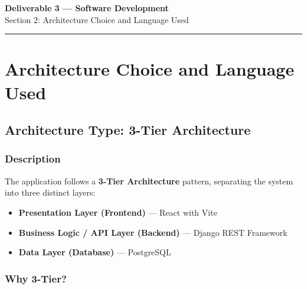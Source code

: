 \documentclass[12pt, a4paper]{article}
\begin{document}

\begin{center}
  {\Large\bfseries\color{primaryblue} Deliverable 3 --- Software Development}\\[6pt]
  {\large\color{secondaryblue} Section 2: Architecture Choice and Language Used}\\[4pt]
  \textcolor{accentblue}{\rule{0.8\linewidth}{1pt}}
\end{center}

\vspace{10pt}

\section{Architecture Choice and Language Used}

\subsection{Architecture Type: 3-Tier Architecture}

\subsubsection{Description}

The application follows a \textbf{3-Tier Architecture} pattern, separating the system into three distinct layers:

\begin{itemize}
  \item \textbf{Presentation Layer (Frontend)} --- React with Vite
  \item \textbf{Business Logic / API Layer (Backend)} --- Django REST Framework
  \item \textbf{Data Layer (Database)} --- PostgreSQL
\end{itemize}

\subsubsection{Why 3-Tier?}
\end{document}
